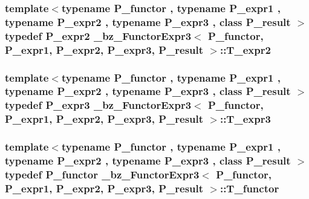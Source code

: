 \subsubsection[{T\+\_\+expr2}]{\setlength{\rightskip}{0pt plus 5cm}template$<$typename P\+\_\+functor , typename P\+\_\+expr1 , typename P\+\_\+expr2 , typename P\+\_\+expr3 , class P\+\_\+result $>$ typedef P\+\_\+expr2 {\bf \+\_\+bz\+\_\+\+Functor\+Expr3}$<$ P\+\_\+functor, P\+\_\+expr1, P\+\_\+expr2, P\+\_\+expr3, P\+\_\+result $>$\+::{\bf T\+\_\+expr2}}\label{class__bz__FunctorExpr3_a942c2f518fa860c92819e1fc7a916511}
\hypertarget{class__bz__FunctorExpr3_a490ef6e4c6ad6c4409b53142860ebaa5}{}
\subsubsection[{T\+\_\+expr3}]{\setlength{\rightskip}{0pt plus 5cm}template$<$typename P\+\_\+functor , typename P\+\_\+expr1 , typename P\+\_\+expr2 , typename P\+\_\+expr3 , class P\+\_\+result $>$ typedef P\+\_\+expr3 {\bf \+\_\+bz\+\_\+\+Functor\+Expr3}$<$ P\+\_\+functor, P\+\_\+expr1, P\+\_\+expr2, P\+\_\+expr3, P\+\_\+result $>$\+::{\bf T\+\_\+expr3}}\label{class__bz__FunctorExpr3_a490ef6e4c6ad6c4409b53142860ebaa5}
\hypertarget{class__bz__FunctorExpr3_aae81209846ad3b2cd702513067b9ef91}{}
\subsubsection[{T\+\_\+functor}]{\setlength{\rightskip}{0pt plus 5cm}template$<$typename P\+\_\+functor , typename P\+\_\+expr1 , typename P\+\_\+expr2 , typename P\+\_\+expr3 , class P\+\_\+result $>$ typedef P\+\_\+functor {\bf \+\_\+bz\+\_\+\+Functor\+Expr3}$<$ P\+\_\+functor, P\+\_\+expr1, P\+\_\+expr2, P\+\_\+expr3, P\+\_\+result $>$\+::{\bf T\+\_\+functor}}\label{class__bz__FunctorExpr3_aae81209846ad3b2cd702513067b9ef91}
\hypertarget{class__bz__FunctorExpr3_ad90a6f210859e4b689cd783be74ee748}{}
